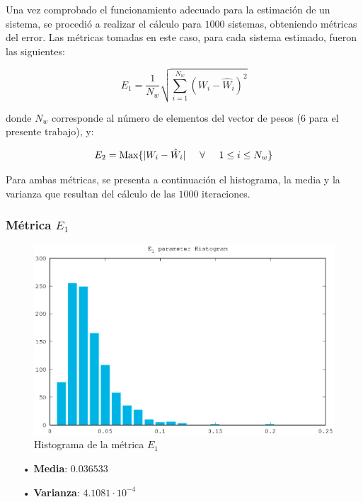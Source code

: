 Una vez comprobado el funcionamiento adecuado para la estimación de un sistema, se procedió a realizar el cálculo para $1000$ sistemas, obteniendo métricas del error. Las métricas tomadas en este caso, para cada sistema estimado, fueron las siguientes:

\begin{equation}
E_1 = \frac{1}{N_w} \sqrt{\sum_{i=1}^{N_w}(W_i-\hat{W}_i)^2}
\end{equation}

donde $N_w$ corresponde al número de elementos del vector de pesos (6 para el presente trabajo), y:

\begin{equation}
E_2 = \text{Max}\{ |W_i - \hat{W}_i| \hspace{0.5cm} \forall \hspace{0.5cm} 1 \leq i \leq N_w\}
\end{equation}

Para ambas métricas, se presenta a continuación el histograma, la media y la varianza que resultan del cálculo de las $1000$ iteraciones.

\newpage

\subsubsection{Métrica $E_1$}

\vspace{-0.5cm}

\begin{figure}[htb!]
    \centering
        \includegraphics[width = 10 cm]{./figures/C05-multiple_system_e1_hist}
        \caption{Histograma de la métrica $E_1$}
        \label{fig:multiple_system_e1_hist}
\end{figure}

\vspace{-0.5cm}

\begin{itemize}
   \item[•] \textbf{Media}: $0.036533$ 
   \item[•] \textbf{Varianza}: $4.1081 \cdot 10^{-4}$
\end{itemize}

